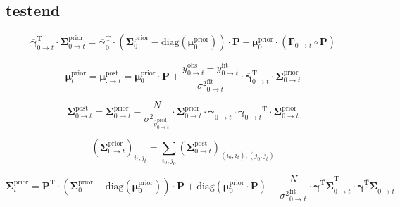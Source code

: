 \documentclass[pdflatex,sn-mathphys-num]{sn-jnl}%
\theoremstyle{thmstyleone}%
\theoremstyle{thmstyletwo}%
\theoremstyle{thmstylethree}%
\begin{document}
\subsection{testend}

\begin{equation}
	\overline{\boldsymbol{\gamma}}^{\mathrm{T}}_{0 \rightarrow t} \cdot \boldsymbol{\Sigma}^{\mathrm{prior}}_{0 \rightarrow t} = 
	\overline{\boldsymbol{\gamma}}_{0}^{\mathrm{T}} \cdot 
	\left( \boldsymbol{\Sigma}^{\mathrm{prior}}_{0} - \mathrm{diag}(\boldsymbol{\mu}^{\mathrm{prior}}_0) \right) \cdot \boldsymbol{P} 
	+ \boldsymbol{\mu}^{\mathrm{prior}}_0 \cdot \left( \overline{\boldsymbol{\Gamma}}_{0 \rightarrow t} \circ \boldsymbol{P} \right)
	\label{eq:gamma_sigma_prior_0t}
\end{equation}


\begin{equation}
	\boldsymbol{\mu}^{\mathrm{prior}}_{t} = \boldsymbol{\mu}^{\mathrm{post}}_{. \rightarrow t} = \boldsymbol{\mu}^{\mathrm{prior}}_0 \cdot \boldsymbol{P} + 
	\frac{y^{\mathrm{obs}}_{0 \rightarrow t} - y^{\mathrm{fit}}_{0 \rightarrow t}}{{\sigma^2}^{\mathrm{fit}}_{0 \rightarrow t}} 
	\cdot \overline{\boldsymbol{\gamma}}^{\mathrm{T}}_{0 \rightarrow t} \cdot \boldsymbol{\Sigma}^{\mathrm{prior}}_{0 \rightarrow t}
	\label{eq:posterior_mean_update_0t}
\end{equation}


\begin{equation}
	\boldsymbol{\Sigma}^{\mathrm{post}}_{0 \rightarrow t} = \boldsymbol{\Sigma}^{\mathrm{prior}}_{0 \rightarrow t} - 
	\frac{N}{{\sigma^2}_{\overline{y}^{\mathrm{pred}}_{0 \rightarrow t}}} \cdot \boldsymbol{\Sigma}^{\mathrm{prior}}_{0 \rightarrow t} \cdot \boldsymbol{\gamma}_{0 \rightarrow t} \cdot 
	{\boldsymbol{\gamma}_{0 \rightarrow t}}^{\mathrm{T}} \cdot \boldsymbol{\Sigma}^{\mathrm{prior}}_{0 \rightarrow t}
	\label{eq:posterior_covariance_update_0_t}
\end{equation}


\begin{equation}
	(\boldsymbol{\Sigma}^{\mathrm{prior}}_{0 \rightarrow t})_{i_{t}, j_{t}} = \sum_{i_{0}, j_{0}} (\boldsymbol{\Sigma}^{\mathrm{post}}_{0 \rightarrow t})_{(i_{0}, i_{t}), (j_{0}, j_{t})}
	\label{eq:prior_covariance_marginalization}
\end{equation}


\begin{equation}
	\boldsymbol{\Sigma}^{\mathrm{prior}}_{t} = 
	\boldsymbol{P}^{\mathrm{T}} \cdot \left( \boldsymbol{\Sigma}^{\mathrm{prior}}_{0} - \mathrm{diag}(\boldsymbol{\mu}^{\mathrm{prior}}_{0}) \right) \cdot \boldsymbol{P}
	+ \mathrm{diag}(\boldsymbol{\mu}^{\mathrm{prior}}_{0} \cdot \boldsymbol{P}) 
	- \frac{N}{{\sigma^2}^{\mathrm{fit}}_{0 \rightarrow t}} \cdot
	\overline{\boldsymbol{\gamma}^{\mathrm{T}} \boldsymbol{\Sigma}}_{0 \rightarrow t}^{\mathrm{T}} \cdot \overline{\boldsymbol{\gamma}^{\mathrm{T}} \boldsymbol{\Sigma}}_{0 \rightarrow t}
	\label{eq:prior_covariance_update_0_t}
\end{equation}
\end{document}
